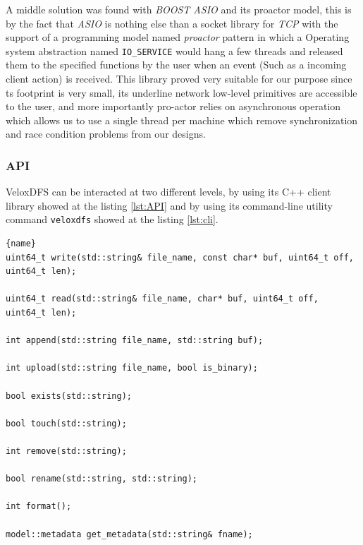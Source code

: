 A middle solution was found with \textit{BOOST ASIO} and its proactor model, this is by the fact that \textit{ASIO} is nothing else than a socket library for \textit{TCP} with the support of a programming model named \textit{proactor} \cite{pyarali1997proactor} pattern in which a Operating system abstraction named \texttt{IO\_SERVICE} would hang a few threads and released them to the specified functions by the user when an event (Such as a incoming client action) is received. This library proved very suitable for our purpose since ts  footprint is very small, its underline network low-level primitives are accessible to the user, and more importantly pro-actor relies on asynchronous operation which allows us to use a single thread per machine which remove synchronization and race condition problems from our designs.

\subsubsection{API}

VeloxDFS can be interacted at two different levels, by using its C++ client library showed at the listing \ref{lst:API} and by using its command-line utility command \texttt{veloxdfs} showed at the listing \ref{lst:cli}. \\

\begin{lstlisting}[caption=extracted from DFS.h, label={lst:API}, frame=tb]{name}
uint64_t write(std::string& file_name, const char* buf, uint64_t off, uint64_t len);
 
uint64_t read(std::string& file_name, char* buf, uint64_t off, uint64_t len);

int append(std::string file_name, std::string buf);

int upload(std::string file_name, bool is_binary);

bool exists(std::string);

bool touch(std::string);

int remove(std::string);

bool rename(std::string, std::string);

int format();

model::metadata get_metadata(std::string& fname);
\end{lstlisting}

